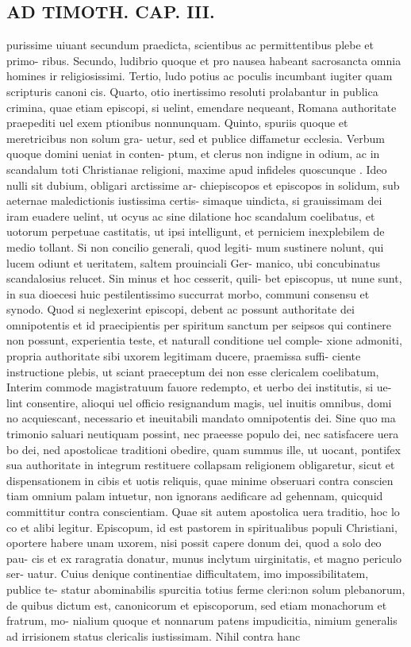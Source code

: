 \documentclass{article}
\begin{document}
\begin{pages}
\section*{AD TIMOTH. CAP. III. }
\marginpar{[ p.495 ]}\pstart purissime uiuant secundum praedicta, scientibus ac permittentibus plebe et primo- ribus. Secundo, ludibrio quoque et pro nausea habeant sacrosancta omnia homines ir religiosissimi. Tertio, ludo potius ac poculis incumbant iugiter quam scripturis canoni cis. Quarto, otio inertissimo resoluti prolabantur in publica crimina, quae etiam episcopi, si uelint, emendare nequeant, Romana authoritate praepediti uel exem ptionibus nonnunquam. Quinto, spuriis quoque et meretricibus non solum gra- uetur, sed et publice diffametur ecclesia. Verbum quoque domini ueniat in conten- ptum, et clerus non indigne in odium, ac in scandalum toti Christianae religioni, maxime apud infideles quoscunque . Ideo nulli sit dubium, obligari arctissime ar- chiepiscopos et episcopos in solidum, sub aeternae maledictionis iustissima certis- simaque uindicta, si grauissimam dei iram euadere uelint, ut ocyus ac sine dilatione hoc scandalum coelibatus, et uotorum perpetuae castitatis, ut ipsi intelligunt, et perniciem inexplebilem de medio tollant. Si non concilio generali, quod legiti- mum sustinere nolunt, qui lucem odiunt et ueritatem, saltem prouinciali Ger- manico, ubi concubinatus scandalosius relucet. Sin minus et hoc cesserit, quili- bet episcopus, ut nune sunt, in sua dioecesi huic pestilentissimo succurrat morbo, communi consensu et synodo. Quod si neglexerint episcopi, debent ac possunt authoritate dei omnipotentis et id praecipientis per spiritum sanctum per seipsos qui continere non possunt, experientia teste, et naturall conditione uel comple- xione admoniti, propria authoritate sibi uxorem legitimam ducere, praemissa suffi- ciente instructione plebis, ut sciant praeceptum dei non esse clericalem coelibatum, Interim commode magistratuum fauore redempto, et uerbo dei institutis, si ue- lint consentire, alioqui uel officio resignandum magis, uel inuitis omnibus, domi no acquiescant, necessario et ineuitabili mandato omnipotentis dei. Sine quo ma trimonio saluari neutiquam possint, nec praeesse populo dei, nec satisfacere uera bo dei, ned apostolicae traditioni obedire, quam summus ille, ut uocant, pontifex sua authoritate in integrum restituere collapsam religionem obligaretur, sicut et dispensationem in cibis et uotis reliquis, quae minime obseruari contra conscien tiam omnium palam intuetur, non ignorans aedificare ad gehennam, quicquid committitur contra conscientiam. Quae sit autem apostolica uera traditio, hoc lo co et alibi legitur. Episcopum, id est pastorem in spiritualibus populi Christiani, oportere habere unam uxorem, nisi possit capere donum dei, quod a solo deo pau- cis et ex raragratia donatur, munus inclytum uirginitatis, et magno periculo ser- uatur. Cuius denique continentiae difficultatem, imo impossibilitatem, publice te- statur abominabilis spurcitia totius ferme cleri:non solum plebanorum, de quibus dictum est, canonicorum et episcoporum, sed etiam monachorum et fratrum, mo- nialium quoque et nonnarum patens impudicitia, nimium generalis ad irrisionem status clericalis iustissimam. Nihil contra hanc 
\end{pages}
\end{document}
